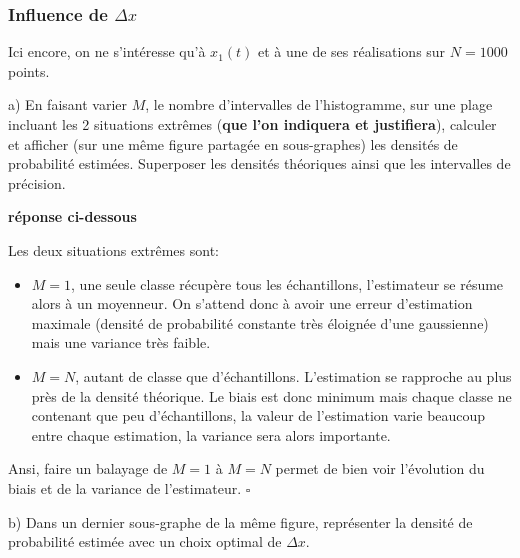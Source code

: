 \documentclass{article}
\newcommand{\debutrep}[1]{\color{blue}\begin{center} \hrulefill \textbf{ #1 } \hrulefill \end{center} }
\newcommand{\finrep}{\vspace*{5mm}\hfill $\square$\color{black}\vspace*{5mm}}
\begin{document}
\subsubsection{Influence de $\Delta x$}

Ici encore, on ne s'intéresse qu'à $x_1(t)$ et à une de ses réalisations sur $N=1000$ points.

\begin{list}{}{\setlength{\leftmargin}{6mm} \setlength{\labelwidth}{20mm} \setlength{\labelsep}{2mm} \setlength{\itemsep}{1mm} }

\item[a)]  En faisant varier $M$, le nombre d'intervalles de l'histogramme, sur une plage incluant les 2 situations extrêmes (\textbf{que l'on indiquera et justifiera}), calculer et afficher (sur une même figure partagée en sous-graphes) les densités de probabilité estimées. Superposer les densités théoriques ainsi que les intervalles de précision.


\debutrep{réponse ci-dessous}
Les deux situations extrêmes sont:

\begin{itemize}
    \item $M=1$, une seule classe récupère tous les échantillons, l'estimateur se résume alors à un moyenneur. On s'attend donc à avoir une erreur d'estimation maximale (densité de probabilité constante très éloignée d'une gaussienne) mais une variance très faible.
    \vspace*{3mm}
    \item $M=N$, autant de classe que d'échantillons. L'estimation se rapproche au plus près de la densité théorique. Le biais est donc minimum mais chaque classe ne contenant que peu d'échantillons, la valeur de l'estimation varie beaucoup entre chaque estimation, la variance sera alors importante.
\end{itemize}
\vspace*{5mm}
Ansi, faire un balayage de $M=1$ à $M=N$ permet de bien voir l'évolution du biais et de la variance de l'estimateur.
\finrep

\newpage
\item[b)] Dans un dernier sous-graphe de la même figure, représenter la densité de probabilité estimée avec un choix optimal de $\Delta x$.


\end{list}
\end{document}
